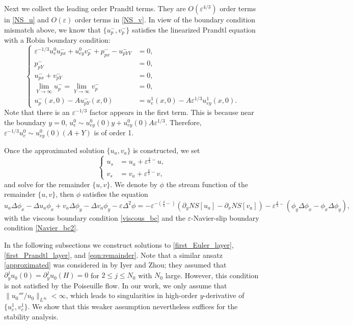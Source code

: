 \documentclass[reqno, 11pt]{amsart}
\theoremstyle{plain}
\theoremstyle{definition}
\theoremstyle{remark}
\numberwithin{equation}{section}
\begin{document}
Next we collect the leading order Prandtl terms. They are $O(\varepsilon^{4/3})$ order terms in \eqref{NS_u} and $O(\varepsilon)$ order terms in \eqref{NS_v}. In view of the boundary condition mismatch above, we know that $\{u_p^-, v_p^-\}$ satisfies the linearized Prandtl equation with a Robin boundary condition:
\begin{equation}\label{first_Prandtl_layer}
\left\{\begin{aligned}
\varepsilon^{-1/3} u_e^0 u_{px}^- + u_{ey}^0 v_p^- + p_{px}^- - u_{pYY}^- &= 0,\\
 p_{pY}^- &= 0,\\
u_{px}^- + v_{pY}^- &= 0,\\
\lim_{Y \to \infty} u_p^- = \lim_{Y \to \infty} v_p^- &= 0,\\
u_p^-(x,0) - A u_{pY}^-(x,0) &= u_e^1(x,0) - A \varepsilon^{1/3} u_{ey}^1(x,0).
\end{aligned}\right.
\end{equation}
Note that there is an $\varepsilon^{-1/3}$ factor appears in the first term. This is because near the boundary $y = 0$, $u_e^0 \sim u_{ey}^0(0) y + u_{ey}^0(0) A \varepsilon^{1/3}$. Therefore, $\varepsilon^{-1/3} u_e^0 \sim u_{ey}^0(0) (A+Y)$ is of order 1.

Once the approximated solution $\{u_a, v_a\}$ is constructed, we set
\begin{equation}\label{ss_construction}
\left\{
\begin{aligned}
u_s &= u_a + \varepsilon^{\frac{4}{3}-} u,\\
v_s &= v_a + \varepsilon^{\frac{4}{3}-} v,
\end{aligned}
\right.
\end{equation}
and solve for the remainder $\{u,v\}$. We denote by $\phi$ the stream function of the remainder $\{u,v\}$, then $\phi$ satisfies the equation
\begin{equation}\label{eqn:remainder}
u_a \Delta \phi_x - \Delta u_a \phi_x + v_a \Delta \phi_y - \Delta v_a \phi_y - \varepsilon \Delta^2 \phi = - \varepsilon^{-(\frac{4}{3}-)}(\partial_y NS[u_a] - \partial_x NS[v_a])  - \varepsilon^{\frac{4}{3}-} (\phi_y \Delta \phi_x - \phi_x \Delta \phi_y),
\end{equation}
with the viscous boundary condition \eqref{viscous_bc} and the $\varepsilon$-Navier-slip boundary condition \eqref{Navier_bc2}.


In the following subsections we construct solutions to \eqref{first_Euler_layer}, \eqref{first_Prandtl_layer}, and \eqref{eqn:remainder}. Note that a similar ansatz \eqref{approximated} was considered in \cite{IyerZhou} by Iyer and Zhou; they assumed that $\partial_y^j u_0(0) = \partial_y^j u_0(H) = 0$ for $2 \le j \le N_0$ with $N_0$ large. However, this condition is not satisfied by the Poiseuille flow. In our work, we only assume that $\| u_0'''/u_0 \|_{L^\infty} < \infty$, which leads to singularities in high-order $y$-derivative of $\{u_e^1, v_e^1\}$. We show that this weaker assumption nevertheless suffices for the stability analysis.
\end{document}
